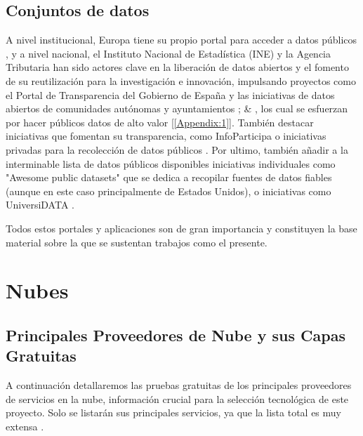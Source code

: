 	
	\subsection{Conjuntos de datos}
	
	A nivel institucional, Europa tiene su propio portal para acceder a datos públicos \citep{PortalDatosEuropa}, y a nivel nacional, el Instituto Nacional de Estadística (INE) y la Agencia Tributaria han sido actores clave en la liberación de datos abiertos y el fomento de su reutilización para la investigación e innovación, impulsando proyectos como el Portal de Transparencia del Gobierno de España y las iniciativas de datos abiertos de comunidades autónomas y ayuntamientos \citep{PortalDatosGob}; \citep{PortalDatosMadrid} \& \citep{PortalRegistradores}, los cual se esfuerzan por hacer públicos datos de alto valor [\ref{Appendix:1}]. También destacar iniciativas que fomentan su transparencia, como InfoParticipa \citep{PortalInfoparticipa} o iniciativas privadas para la recolección de datos públicos \citep{PortalEsriEspanna}. Por ultimo, también añadir a la interminable lista de datos públicos disponibles iniciativas individuales como "Awesome public datasets" \citep{awesomePublicDatasets} que se dedica a recopilar fuentes de datos fiables (aunque en este caso principalmente de Estados Unidos), o iniciativas como UniversiDATA \citep{UniversiDATA}.
	
	Todos estos portales y aplicaciones son de gran importancia y constituyen la base material sobre la que se sustentan trabajos como el presente.
	
\section{Nubes}


\subsection{Principales Proveedores de Nube y sus Capas Gratuitas}
\label{sec:cloud-free-tiers}

A continuación detallaremos las pruebas gratuitas de los principales proveedores de servicios en la nube, información crucial para la selección tecnológica de este proyecto. Solo se listarán sus principales servicios, ya que la lista total es muy extensa \citep{free-for-dev}.

